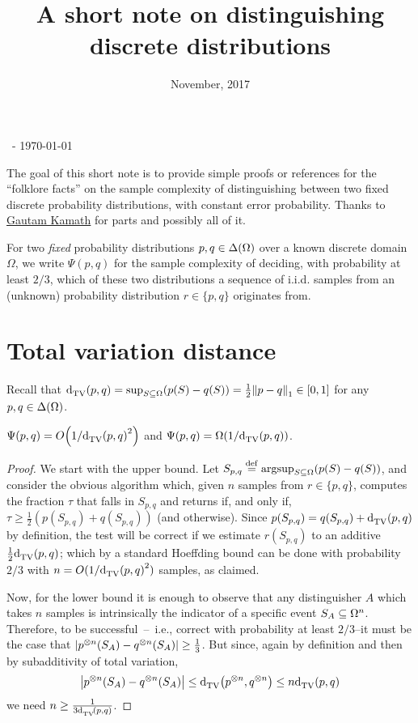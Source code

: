 \documentclass[10pt]{article}
\title{A short note on distinguishing discrete distributions}
\date{November, 2017}
\begin{document}
\begin{flushleft}\sf\footnotesize
\makeatletter
\@date~- \today \hfill \@title
\makeatother
\end{flushleft}
\vspace{5mm}

The goal of this short note is to provide simple proofs or references for the ``folklore facts'' on the sample complexity of distinguishing between two fixed discrete probability distributions, with constant error probability. Thanks to \href{http://www.gautamkamath.com/}{Gautam Kamath} for parts and possibly all of it.\bigskip

For two \emph{fixed} probability distributions $p,q\in\Delta\!\left(\Omega\right)$ over a known discrete domain $\Omega$, we write $\Psi(p,q)$ for the sample complexity of deciding, with probability at least $2/3$, which of these two distributions a sequence of i.i.d. samples from an (unknown) probability distribution $r\in\{p,q\}$ originates from.
\section{Total variation distance}

Recall that ${\operatorname{d}_{\rm TV}^{}\!\left({p, q}\right)} = \sup_{S\subseteq \Omega} (p(S)-q(S)) = \frac{1}{2}{\lVert p-q{\rVert}}_1\in[0,1]$ for any $p,q\in\Delta\!\left(\Omega\right)$. 

\begin{theorem}\label{theo:testing:tv}
  $\Psi(p,q) = \bigO{1/\totalvardist{p}{q}^2}$ and $\Psi(p,q) = \bigOmega{1/\totalvardist{p}{q}}$.
\end{theorem}
\begin{proof}
  We start with the upper bound. Let $S_{p,q}\stackrel{\rm def}{=} \arg\!\sup_{S\subseteq \Omega} (p(S)-q(S))$, and consider the obvious algorithm which, given $n$ samples from $r\in\{p,q\}$, computes the fraction $\tau$ that falls in $S_{p,q}$ and returns \accept if, and only if, $\tau \geq \frac{1}{2}\left(p(S_{p,q})+q(S_{p,q})\right)$ (and \reject otherwise). Since $p(S_{p,q}) = q(S_{p,q})+{\operatorname{d}_{\rm TV}^{}\!\left({p, q}\right)}$ by definition, the test will be correct if we estimate $r(S_{p,q})$ to an additive $\frac{1}{2}{\operatorname{d}_{\rm TV}^{}\!\left({p, q}\right)}$; which by a standard Hoeffding bound can be done with probability $2/3$ with $n=O(1/{\operatorname{d}_{\rm TV}^{}\!\left({p, q}\right)}^2)$ samples, as claimed.
  
  Now, for the lower bound it is enough to observe that any distinguisher $A$ which takes $n$ samples is intrinsically the indicator of a specific event $S_A\subseteq \Omega^n$. Therefore, to be successful~--~i.e., correct with probability at least $2/3$--it must be the case that $\left\lvert  p^{\otimes n}(S_A)-q^{\otimes n}(S_A)  \right\rvert \geq \frac{1}{3}$. But since, again by definition and then by subadditivity of total variation,
  \[
        \left\lvert  p^{\otimes n}(S_A)-q^{\otimes n}(S_A)  \right\rvert \leq {\operatorname{d}_{\rm TV}^{}\!\left({p^{\otimes n}, q^{\otimes n}}\right)} \leq n {\operatorname{d}_{\rm TV}^{}\!\left({p, q}\right)}
  \]
  we need $n\geq \frac{1}{3 {\operatorname{d}_{\rm TV}^{}\!\left({p, q}\right)}}$.
\end{proof}
\end{document}
